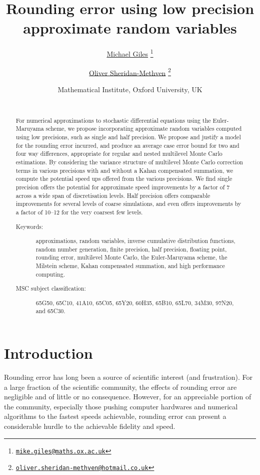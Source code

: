 \documentclass[9pt,a4paper,english]{extarticle}
\title{\Huge Rounding error using low precision approximate random variables}
\author{
\href{mailto:mike.giles@maths.ox.ac.uk}{Michael Giles}%
\thanks{\href{mailto:mike.giles@maths.ox.ac.uk}%
{\texttt{mike.giles@maths.ox.ac.uk}}} 
\and 
\href{mailto:oliver.sheridan-methven@hotmail.co.uk}{Oliver Sheridan-Methven}%
\thanks{\href{mailto:oliver.sheridan-methven@hotmail.co.uk}%
{\texttt{oliver.sheridan-methven@hotmail.co.uk}}}
}
\date{
Mathematical Institute, Oxford University, UK\\[1em]
\datedayname\ \nth{\number\day} \monthname\  \number\year}
\begin{document}
\maketitle

\begin{abstract}
For numerical approximations to stochastic differential equations using the Euler-Maruyama scheme, we propose incorporating approximate random variables computed using low precisions, such as single and half precision. We propose and justify a model for the rounding error incurred, and produce an average case error bound for two and four way differences, appropriate for regular and nested multilevel Monte Carlo estimations. By considering the variance structure of  multilevel Monte Carlo correction terms in various precisions with and without a Kahan compensated summation, we compute the potential speed ups offered from the various precisions. We find single precision offers the potential for approximate speed improvements by a factor of 7 across a wide span of discretisation levels. Half precision offers comparable improvements for several levels of coarse simulations, and even offers improvements by a factor of 10--12 for the very coarsest few levels. 

\begin{description}
\item[Keywords:] approximations, random variables, inverse cumulative distribution functions, random number generation, finite precision, half precision, floating point, rounding error, multilevel Monte Carlo, the Euler-Maruyama scheme, the Milstein scheme, Kahan compensated summation, and high performance computing.
\item[MSC subject classification:] 	65G50, 65C10, 41A10, 65C05, 65Y20, 60H35, 65B10, 65L70, 34M30, 97N20, and 65C30.
\end{description}
\end{abstract}


\section{Introduction}
\label{sec:introduction}

Rounding error has long been a source of scientific interest (and frustration). For a large fraction of the scientific community, the effects of rounding error are negligible and of little or no consequence. However, for an appreciable portion of the community, especially those pushing computer hardwares and numerical algorithms to the fastest speeds achievable, rounding error can present a considerable hurdle to the achievable fidelity and speed.
\end{document}
